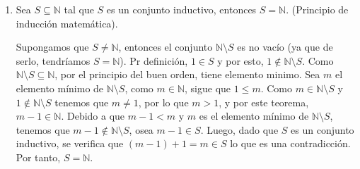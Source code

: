 \documentclass[11pt]{article}
\newcommand{\N}{\mathbb{N}}
\newcommand{\R}{\mathbb{R}}
\let\subset\subseteq
\begin{document}
\begin{enumerate}[label=\alph*)]
\begin{enumerate}[label=\roman*)]

        \item Sea $S\subseteq \N$ tal que $S$ es un conjunto inductivo, entonces $S=\N$. (Principio de inducción matemática).

            Supongamos que $S\neq \N$, entonces el conjunto $\N\setminus S$ es no vacío (ya que de serlo, tendríamos $S=\N$). Pr definición, $1\in S$ y por esto, $1\notin \N\setminus S$. Como $\N\setminus S\subset \N$, por el principio del buen orden, tiene elemento minimo. Sea $m$ el elemento mínimo de $\N\setminus S$, como $m\in \N$, sigue que $1 \leq m$. Como $m\in \N\setminus S$ y $1\notin \N\setminus S$ tenemos que $m\neq 1$, por lo que $m>1$, y por este teorema, $m-1\in \N$. Debido a que $m-1<m$ y $m$ es el elemento mínimo de $\N \setminus S$, tenemos que $m-1\notin \N\setminus S$, osea $m-1\in S$. Luego, dado que $S$ es un conjunto inductivo, se verifica que $(m-1)+1=m\in S$ lo que es una contradicción. Por tanto, $S=\N$.    


\end{enumerate}
\end{enumerate}
\end{document}
